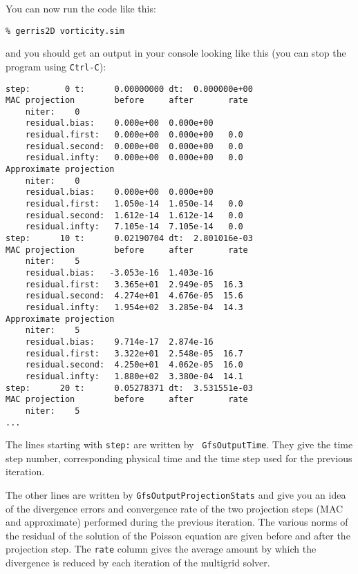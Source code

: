 \documentclass[a4paper]{article}
\begin{document}
You can now run the code like this:
\begin{verbatim}
% gerris2D vorticity.sim
\end{verbatim}
and you should get an output in your console looking like this (you
can stop the program using {\tt Ctrl-C}):
\begin{verbatim}
step:       0 t:      0.00000000 dt:  0.000000e+00
MAC projection        before     after       rate
    niter:    0
    residual.bias:    0.000e+00  0.000e+00
    residual.first:   0.000e+00  0.000e+00   0.0
    residual.second:  0.000e+00  0.000e+00   0.0
    residual.infty:   0.000e+00  0.000e+00   0.0
Approximate projection
    niter:    0
    residual.bias:    0.000e+00  0.000e+00
    residual.first:   1.050e-14  1.050e-14   0.0
    residual.second:  1.612e-14  1.612e-14   0.0
    residual.infty:   7.105e-14  7.105e-14   0.0
step:      10 t:      0.02190704 dt:  2.801016e-03
MAC projection        before     after       rate
    niter:    5
    residual.bias:   -3.053e-16  1.403e-16
    residual.first:   3.365e+01  2.949e-05  16.3
    residual.second:  4.274e+01  4.676e-05  15.6
    residual.infty:   1.954e+02  3.285e-04  14.3
Approximate projection
    niter:    5
    residual.bias:    9.714e-17  2.874e-16
    residual.first:   3.322e+01  2.548e-05  16.7
    residual.second:  4.250e+01  4.062e-05  16.0
    residual.infty:   1.880e+02  3.380e-04  14.1
step:      20 t:      0.05278371 dt:  3.531551e-03
MAC projection        before     after       rate
    niter:    5
...
\end{verbatim}
The lines starting with {\tt step:} are written by {\tt
GfsOutputTime}. They give the time step number, corresponding physical
time and the time step used for the previous iteration.

The other lines are written by {\tt GfsOutputProjectionStats} and give
you an idea of the divergence errors and convergence rate of the two
projection steps (MAC and approximate) performed during the previous
iteration. The various norms of the residual of the solution of the
Poisson equation are given before and after the projection step. The
{\tt rate} column gives the average amount by which the divergence is
reduced by each iteration of the multigrid solver.
\end{document}
